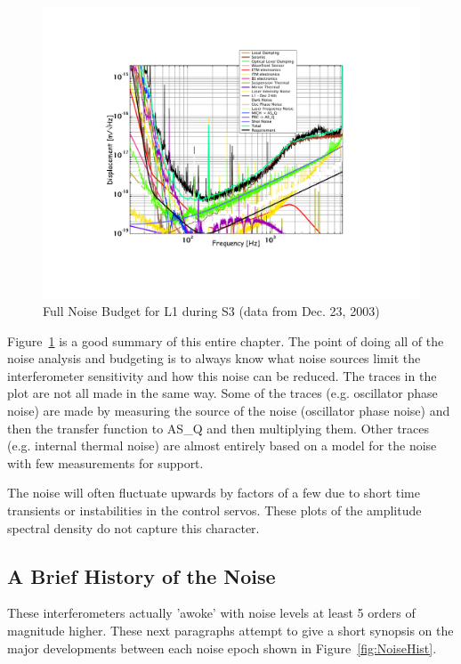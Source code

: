 \begin{figure}[!h]
\centerline{
\includegraphics[angle=-90,width=6.5in]{Figures/Chap4/S3noise.pdf}}
\caption[S3 Noise]{Full Noise Budget for L1 during S3 (data from Dec. 23, 2003)}
\label{fig:S3noise}
\end{figure}
Figure~\ref{fig:S3noise} is a good summary of this entire chapter. The point of
doing all of the noise analysis and budgeting is to always know what noise
sources limit the interferometer sensitivity and how this noise can be reduced.
The traces in the plot are not all made in the same way. Some of the traces
(e.g. oscillator phase noise) are made by measuring the source of the noise
(oscillator phase noise) and then the transfer function to AS\_Q and then 
multiplying them. Other traces
(e.g. internal thermal noise) are almost entirely based on a model for the
noise with few measurements for support.

The noise will often fluctuate upwards by factors of a few due to short time
transients or instabilities in the control servos. These plots of the amplitude
spectral density do not capture this character.


\subsection{A Brief History of the Noise}

These interferometers actually 'awoke' with noise levels at least 5 orders
of magnitude higher. These next paragraphs attempt to give a short synopsis 
on the major developments between each noise epoch shown 
in Figure~\ref{fig:NoiseHist}.

